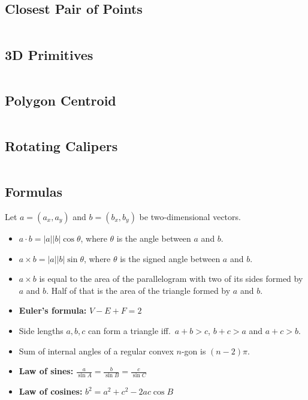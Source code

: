 \documentclass[9pt,a4paper,twocolumn,landscape,oneside]{amsart}
\newcommand{\code}[1]{\inputminted{cpp}{_code/#1}}
\newif\ifverbose
\begin{document}
    \subsection{Closest Pair of Points}
        \ifverbose
        A sweep line algorithm for computing the distance between the closest
        pair of points.
        \fi
        \code{geometry/closest_pair.cpp}

    \subsection{3D Primitives}
        \ifverbose
        Three-dimensional geometry primitives.
        \fi
        \code{geometry/primitives3d.cpp}

    \subsection{Polygon Centroid}
        \code{geometry/polygon_centroid.cpp}

    \subsection{Rotating Calipers}
        \code{geometry/rotating_calipers.cpp}

    \subsection{Formulas}
        Let $a = (a_x, a_y)$ and $b = (b_x, b_y)$ be two-dimensional vectors.
        \begin{itemize}
            \item $a\cdot b = |a||b|\cos{\theta}$, where $\theta$ is the angle
                between $a$ and $b$.
            \item $a\times b = |a||b|\sin{\theta}$, where $\theta$ is the
                signed angle between $a$ and $b$.
            \item $a\times b$ is equal to the area of the parallelogram with
                two of its sides formed by $a$ and $b$. Half of that is the
                area of the triangle formed by $a$ and $b$.
            \item \textbf{Euler's formula:} $V - E + F = 2$
            \item Side lengths $a,b,c$ can form a triangle iff.\ $a+b>c$, $b+c>a$ and $a+c>b$.
            \item Sum of internal angles of a regular convex $n$-gon is $(n-2)\pi$.
            \item \textbf{Law of sines:} $\frac{a}{\sin A} = \frac{b}{\sin B} = \frac{c}{\sin C}$
            \item \textbf{Law of cosines:} $b^2 = a^2 + c^2 - 2ac\cos B$
        \end{itemize}
\end{document}
